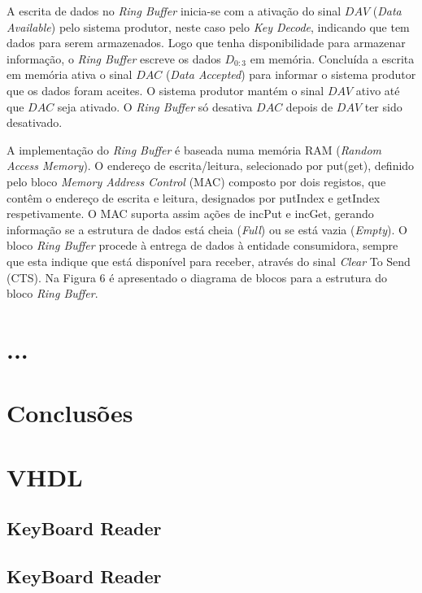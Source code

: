 \documentclass[10pt,a4paper,twocolumn]{article}
\begin{document}
A escrita de dados no \textit{Ring Buffer} inicia-se com a ativação do sinal $DAV$ (\textit{Data Available}) pelo sistema produtor, neste caso pelo \textit{Key Decode}, indicando que tem dados para serem armazenados. 
Logo que tenha disponibilidade para armazenar informação, o \textit{Ring Buffer }escreve os dados $D_{0:3}$ em memória. 
Concluída a escrita em memória ativa o sinal $DAC$ (\textit{Data Accepted}) para informar o sistema produtor que os dados foram aceites. O sistema produtor mantém o sinal $DAV$ ativo até que $DAC$ seja ativado. 
O \textit{Ring Buffer} só desativa $DAC$ depois de $DAV$ ter sido desativado.

A implementação do \textit{Ring Buffer} é baseada numa memória RAM (\textit{Random Access Memory}). 
O endereço de escrita/leitura, selecionado por put(get), definido pelo bloco \textit{Memory Address Control }(MAC) composto por dois registos, que contêm o endereço de escrita e leitura, designados por putIndex e getIndex respetivamente. 
O MAC suporta assim ações de incPut e incGet, gerando informação se a estrutura de dados está cheia (\textit{Full}) ou se está vazia (\textit{Empty}). 
O bloco \textit{Ring Buffer }procede à entrega de dados à entidade consumidora, sempre que esta indique que está disponível para receber, através do sinal \textit{Clear} To Send (CTS). 
Na Figura 6 é apresentado o diagrama de blocos para a estrutura do bloco \textit{Ring Buffer}.

\section{...}

\section{Conclusões}

\onecolumn
\clearpage
\appendix
\section{VHDL}
\subsection{KeyBoard Reader}
\label{sec:keyboardReader_VHDL}

\subsection{KeyBoard Reader}
\label{sec:keyboardReader_VHDL}
\begin{minipage}{\linewidth}
\footnotesize
\inputminted{vhdl}{vhdl/ficheiro1.vhd}
\label{vhdl:fichiero1}
\end{minipage}
\end{document}
